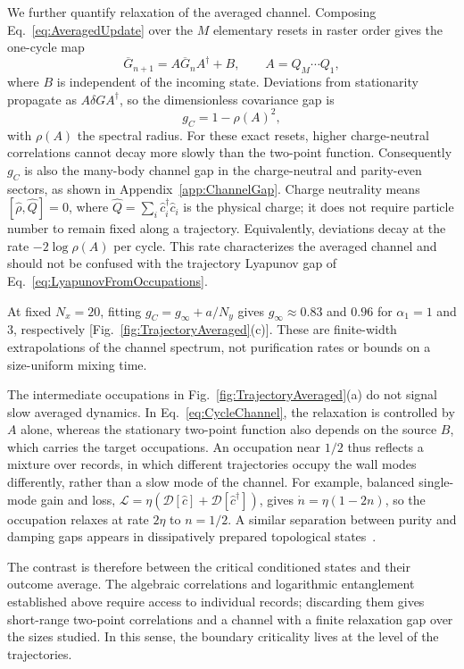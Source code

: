 \documentclass[aps,prb,10pt,twocolumn,superscriptaddress,longbibliography,floatfix]{revtex4-2}
\newcommand{\mc}[1]{\mathcal{#1}}
\newcommand{\newtext}[1]{{\color{blue}#1}}
\newcommand{\claudeadd}[1]{{\color{orange}#1}}
\begin{document}
{\color{blue}
We further quantify relaxation of the averaged channel. Composing Eq.~\eqref{eq:AveragedUpdate} over the $M$ elementary resets in raster order gives the one-cycle map
\begin{equation}
 \overline G_{n+1}=A\overline G_nA^\dagger+B,\qquad A=Q_M\cdots Q_1,
 \label{eq:CycleChannel}
\end{equation}
where $B$ is independent of the incoming state. Deviations from stationarity propagate as $A\delta G A^\dagger$, so the dimensionless covariance gap is
\begin{equation}
 g_C=1-\rho(A)^2,
 \label{eq:ChannelGap}
\end{equation}
with $\rho(A)$ the spectral radius. For these exact resets, higher charge-neutral correlations cannot decay more slowly than the two-point function. Consequently $g_C$ is also the many-body channel gap in the charge-neutral and parity-even sectors, as shown in Appendix~\ref{app:ChannelGap}. Charge neutrality means $[\hat\rho,\hat Q]=0$, where $\hat Q=\sum_i\hat c_i^\dagger\hat c_i$ is the physical charge; it does not require particle number to remain fixed along a trajectory. \claudeadd{Equivalently, deviations decay at the rate $-2\log\rho(A)$ per cycle. This rate characterizes the averaged channel and should not be confused with the trajectory Lyapunov gap of Eq.~\eqref{eq:LyapunovFromOccupations}.}

At fixed $N_x=20$, fitting $g_C=g_\infty+a/N_y$ gives $g_\infty\approx0.83$ and $0.96$ for $\alpha_1=1$ and $3$, respectively [Fig.~\ref{fig:TrajectoryAveraged}(c)]. These are finite-width extrapolations of the channel spectrum, not purification rates or bounds on a size-uniform mixing time.

\claudeadd{The intermediate occupations in Fig.~\ref{fig:TrajectoryAveraged}(a) do not signal slow averaged dynamics. In Eq.~\eqref{eq:CycleChannel}, the relaxation is controlled by $A$ alone, whereas the stationary two-point function also depends on the source $B$, which carries the target occupations. An occupation near $1/2$ thus reflects a mixture over records, in which different trajectories occupy the wall modes differently, rather than a slow mode of the channel. \newtext{For example, balanced single-mode gain and loss, $\mc L=\eta(\mc D[\hat c]+\mc D[\hat c^\dagger])$, gives $\dot n=\eta(1-2n)$, so the occupation relaxes at rate $2\eta$ to $n=1/2$.} A similar separation between purity and damping gaps appears in dissipatively prepared topological states~\cite{BardynEtAl2013}.}

The contrast is therefore between the critical conditioned states and their outcome average. The algebraic correlations and logarithmic entanglement established above require access to individual records; discarding them gives short-range two-point correlations and a channel with a finite relaxation gap over the sizes studied. In this sense, the boundary criticality lives at the level of the trajectories.   
}
\end{document}
